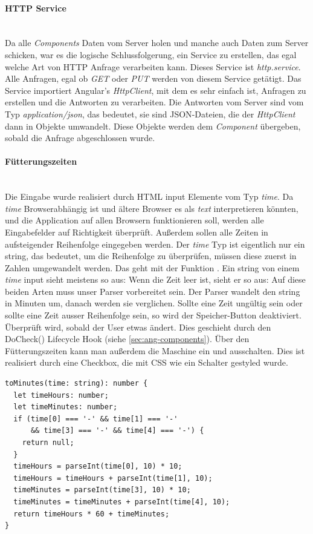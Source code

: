 \paragraph*{\ac{HTTP} Service}\mbox{}\\
Da alle \textit{Components} Daten vom Server holen und manche auch Daten zum Server schicken, war es die logische Schlussfolgerung, ein Service zu erstellen, das egal welche Art von \ac{HTTP} Anfrage verarbeiten kann. Dieses Service ist \textit{http.service}. Alle Anfragen, egal ob \textit{GET} oder \textit{PUT} werden von diesem Service getätigt. Das Service importiert Angular's \textit{HttpClient}, mit dem es sehr einfach ist, Anfragen zu erstellen und die Antworten zu verarbeiten. Die Antworten vom Server sind vom Typ \textit{application/json}, das bedeutet, sie sind \ac{JSON}-Dateien, die der \textit{HttpClient} dann in Objekte umwandelt. Diese Objekte werden dem \textit{Component} übergeben, sobald die Anfrage abgeschlossen wurde.

\paragraph*{Fütterungszeiten}\mbox{}\\
Die Eingabe wurde realisiert durch \ac{HTML} input Elemente vom Typ \textit{time}. Da \textit{time} Browserabhängig ist und ältere Browser es als \textit{text} interpretieren könnten, und die Application auf allen Browsern funktionieren soll, werden alle Eingabefelder auf Richtigkeit überprüft. Außerdem sollen alle Zeiten in aufsteigender Reihenfolge eingegeben werden. Der \textit{time} Typ ist eigentlich nur ein string, das bedeutet, um die Reihenfolge zu überprüfen, müssen diese zuerst in Zahlen umgewandelt werden. Das geht mit der Funktion . Ein string von einem \textit{time} input sieht meistens so aus:  Wenn die Zeit leer ist, sieht er so aus:  Auf diese beiden Arten muss unser Parser vorbereitet sein. Der Parser wandelt den string in Minuten um, danach werden sie verglichen. Sollte eine Zeit ungültig sein oder sollte eine Zeit ausser Reihenfolge sein, so wird der Speicher-Button deaktiviert. Überprüft wird, sobald der User etwas ändert. Dies geschieht durch den DoCheck() Lifecycle Hook (siehe \ref{sec:ang-components}). Über den Fütterungszeiten kann man außerdem die Maschine ein und ausschalten. Dies ist realisiert durch eine Checkbox, die mit \ac{CSS} wie ein Schalter gestyled wurde.

\begin{lstlisting}[caption=Zeiten Parser,style=TS,label=zeiten_parser,captionpos=t]
toMinutes(time: string): number {
  let timeHours: number;
  let timeMinutes: number;
  if (time[0] === '-' && time[1] === '-' 
      && time[3] === '-' && time[4] === '-') {
    return null;
  }
  timeHours = parseInt(time[0], 10) * 10;
  timeHours = timeHours + parseInt(time[1], 10);
  timeMinutes = parseInt(time[3], 10) * 10;
  timeMinutes = timeMinutes + parseInt(time[4], 10);
  return timeHours * 60 + timeMinutes;
}
\end{lstlisting}

